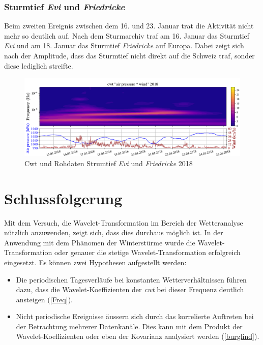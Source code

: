 \begin{refsection}
\subsubsection{Sturmtief {\em Evi}  und {\em Friedricke} }
\label{evi}
Beim zweiten Ereignis zwischen dem 16. und 23. Januar trat die Aktivität nicht mehr so deutlich auf.
Nach dem Sturmarchiv  \cite{online:sturmarchiv} traf am 16. Januar das Sturmtief {\em Evi}  und am 18. Januar das Sturmtief {\em Friedricke} auf Europa. Dabei zeigt sich nach der Amplitude, dass das Sturmtief nicht direkt auf die Schweiz traf, sonder diese lediglich streifte. 

\begin{figure}[h]
	\centering
	\includegraphics[width=1\textwidth]{papers/wwt/images/storm_airp_wind_zoom2.pdf}
	\caption{Cwt und Rohdaten Strumtief {\em Evi}  und {\em Friedricke} 2018}
	\label{fig:cwt_storm_zoom2}
\end{figure}



\section{Schlussfolgerung}

Mit dem Versuch, die Wavelet-Transformation im Bereich der Wetteranalyse nützlich anzuwenden, zeigt sich, dass dies durchaus möglich ist.
In der Anwendung mit dem Phänomen der Winterstürme wurde die Wavelet-Transformation oder genauer die stetige Wavelet-Transformation erfolgreich eingesetzt.
Es können zwei Hypothesen aufgestellt werden:
\begin{itemize}
	\item Die periodischen Tagesverläufe bei konstanten Wetterverhältnissen führen dazu, dass die Wavelet-Koeffizienten der \textit{cwt} bei dieser Frequenz deutlich ansteigen (\ref{Freq}).
	
	\item Nicht periodische Ereignisse äussern sich durch das korrelierte Auftreten bei der Betrachtung mehrerer Datenkanäle. Dies kann mit dem Produkt der Wavelet-Koeffizienten oder eben der Kovarianz analysiert werden (\ref{burglind}).
\end{itemize}



\end{refsection}
